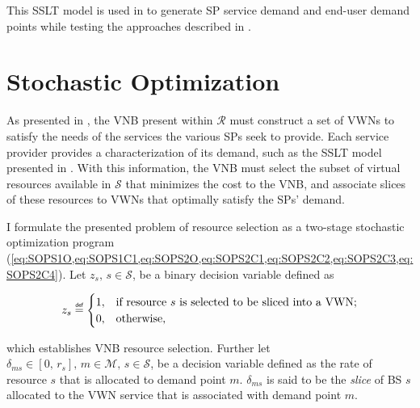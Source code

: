 \documentclass[12pt,dvipsnames]{report}
\newif\ifisdoublespacing
\newcommand\defeq{\mathrel{\overset{\makebox[0pt]{\mbox{\normalfont\tiny\sffamily def}}}{=}}}
\begin{document}
This SSLT model is used in  to generate SP service demand and end-user demand points while testing the approaches described in .

\section{Stochastic Optimization} \label{sec:stochopt}

As presented in , the VNB present within $\mathcal{R}$ must construct a set of VWNs to satisfy the needs of the services the various SPs seek to provide.  Each service provider provides a characterization of its demand, such as the SSLT model presented in .  With this information, the VNB must select the subset of virtual resources available in $\mathcal{S}$ that minimizes the cost to the VNB, and associate slices of these resources to VWNs that optimally satisfy the SPs' demand.

I formulate the presented problem of resource selection as a two-stage stochastic optimization program (\cref{eq:SOPS1O,eq:SOPS1C1,eq:SOPS2O,eq:SOPS2C1,eq:SOPS2C2,eq:SOPS2C3,eq:SOPS2C4}).  Let $z_s,\, s \in \mathcal{S}$, be a binary decision variable defined as

\ifisdoublespacing
\begin{singlespacing}
\begin{equation} \label{eq:z_s}
z_s \defeq
	\begin{cases}
		1,& \text{if resource $s$ is selected to be sliced into a VWN;}\\
		\\
		0,& \text{otherwise.}
	\end{cases}
\end{equation}
\end{singlespacing}
\else
\begin{equation} \label{eq:z_s}
z_s \defeq
	\begin{cases}
		1,& \text{if resource $s$ is selected to be sliced into a VWN;}\\
		0,& \text{otherwise,}
	\end{cases}
\end{equation}
\fi

\noindent which establishes VNB resource selection.  Further let $\delta_{ms} \in \left[ 0 ,\, r_s \right],\, m \in \mathcal{M},\, s \in \mathcal{S}$, be a decision variable defined as the rate of resource $s$ that is allocated to demand point $m$.  $\delta_{ms}$ is said to be the \emph{slice} of BS $s$ allocated to the VWN service that is associated with demand point $m$.
\end{document}
